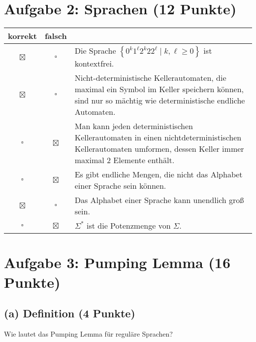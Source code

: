 \documentclass{scrartcl}
\begin{document}
\section*{Aufgabe 2: Sprachen \hfill{} (12 Punkte)}

\newcommand{\mpsol}{\setlength{\fboxsep}{2pt}\colorbox{lightgray!20}{$\boxtimes$}}
\renewcommand{\mp}{\setlength{\fboxsep}{2pt}\colorbox{lightgray!20}{$\square$}}

{\renewcommand{\arraystretch}{1.4}
   \begin{tabularx}{\textwidth}{ccX}
      korrekt & falsch & \\ \hline
      \mpsol & \mp & Die Sprache $\left\{0^k1^\ell2^k22^\ell \mid k,\ell\ge 0\right\}$ ist kontextfrei.\\
      \mpsol & \mp & Nicht-deterministische Kellerautomaten, die maximal ein Symbol im Keller
      speichern können, sind nur so mächtig wie deterministische
      endliche Automaten. \\
      \mp & \mpsol & Man kann jeden deterministischen Kellerautomaten in einen
      nichtdeterministischen Kellerautomaten umformen, dessen Keller immer maximal 2
      Elemente enthält.\\
      \mp & \mpsol & Es gibt endliche Mengen, die nicht das Alphabet einer Sprache
      sein können. \\
      \mpsol & \mp & Das Alphabet einer Sprache kann unendlich groß sein.\\
      \mp & \mpsol & $\Sigma^*$ ist die Potenzmenge von $\Sigma$.
\end{tabularx}}

\pagebreak
\section*{Aufgabe 3: Pumping Lemma \hfill (16 Punkte)}
\subsection*{(a) Definition \hfill \normalfont (4 Punkte)}
Wie lautet das Pumping Lemma für reguläre Sprachen?

\vspace{4pt}
\noindent{}
\end{document}

